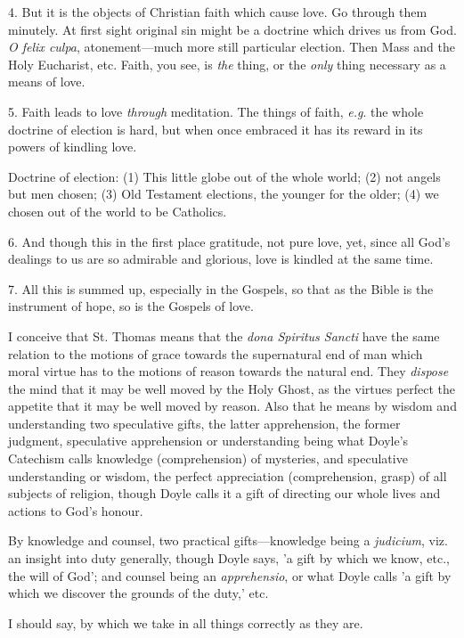 4. But it is the objects of Christian faith which
cause love. Go through them minutely. At first sight original sin
might be a doctrine which drives us from God. \emph{O felix culpa},
atonement—much more still particular election. Then Mass and the
Holy Eucharist, etc. Faith, you see, is \emph{the} thing, or the \emph{only}
thing necessary as a means of love.

5. Faith leads to love \emph{through} meditation.
The things of faith, \emph{e.g}. the whole doctrine of election is
hard, but when once embraced it has its reward in its powers of
kindling love.

Doctrine of election: (1) This little globe out
of the whole world; (2) not angels but men chosen; (3) Old Testament
elections, the younger for the older; (4) we chosen out of the world
to be Catholics.

6. And though this in the first place gratitude,
not pure love, yet, since all God's dealings to us are so
admirable and glorious, love is kindled at the same time.

7. All this is summed up, especially in the
Gospels, so that as the Bible is the instrument of hope, so is the
Gospels of love.


I conceive that St. Thomas means that the \emph{dona
Spiritus Sancti} have the same relation to the motions of grace
towards the supernatural end of man which moral virtue has to the
motions of reason towards the natural end. They \emph{dispose} the
mind that it may be well moved by the Holy Ghost, as the virtues
perfect the appetite that it may be well moved by reason. Also that he
means by wisdom and understanding two speculative gifts, the latter
apprehension, the former judgment, speculative apprehension or
understanding being what Doyle's Catechism calls knowledge
(comprehension) of mysteries, and speculative understanding or wisdom,
the perfect appreciation (comprehension, grasp) of all subjects of
religion, though Doyle calls it a gift of directing our whole lives
and actions to God's honour.

By knowledge and counsel, two practical
gifts—knowledge being a \emph{judicium}, viz. an insight into duty
generally, though Doyle says, 'a gift by which we know, etc., the will
of God'; and counsel being an \emph{apprehensio}, or what Doyle calls
'a gift by which we discover the grounds of the duty,' etc.

I should say, by which we take in all things
correctly as they are.

